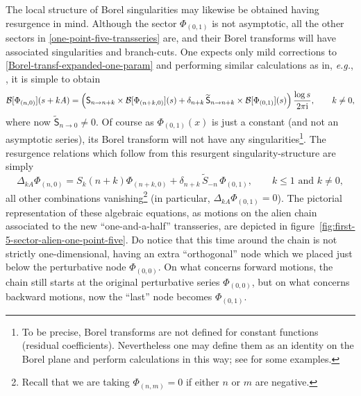 \documentclass[11pt,a4paper]{article}
\newcommand{\CB}{{\cal B}}
\newcommand{\be}{\begin{equation}}
\newcommand{\ee}{\end{equation}}
\newcommand{\rmi}{{\mathrm{i}}}
\begin{document}
The local structure of Borel singularities may likewise be obtained having resurgence in mind. Although the sector $\Phi_{(0,1)}$ is not asymptotic, all the other sectors in \eqref{one-point-five-transseries} are, and their Borel transforms will have associated singularities and branch-cuts. One expects only mild corrections to \eqref{Borel-transf-expanded-one-param} and performing similar calculations as in, \textit{e.g.}, \cite{asv11}, it is simple to obtain
%
\be
\label{Borel-transf-expanded-one-point-five}
\CB [\Phi_{(n,0)}] (s+kA) = \left( \mathsf{S}_{n\to n+k} \times \CB [\Phi_{(n+k,0)}] (s) + \delta_{n+k}\, \widetilde{\mathsf{S}}_{n\to n+k} \times \CB [\Phi_{(0,1)}] (s) \right) \frac{\log s}{2\pi\rmi}, \qquad k \neq 0,
\ee
%
\noindent
where now $\widetilde{\mathsf{S}}_{n\to0} \neq 0$. Of course as $\Phi_{(0,1)}(x)$ is just a constant (and not an asymptotic series), its Borel transform will not have any singularities\footnote{To be precise, Borel transforms are not defined for constant functions (residual coefficients). Nevertheless one may define them as an identity on the Borel plane and perform calculations in this way; see \cite{d14} for some examples.}. The resurgence relations which follow from this resurgent singularity-structure are simply
%
\be
\label{Delta-ka-one-point-five}
\Delta_{k A} \Phi_{(n,0)} = S_k \left(n+k\right) \Phi_{(n+k,0)} + \delta_{n+k}\, \widetilde{S}_{-n}\, \Phi_{(0,1)}, \qquad k \le 1 \text{  and  } k \neq 0,
\ee
%
\noindent
all other combinations vanishing\footnote{Recall that we are taking $\Phi_{(n,m)}=0$ if either $n$ or $m$ are negative.} (in particular, $\Delta_{kA} \Phi_{(0,1)} = 0$). The pictorial representation of these algebraic equations, as motions on the alien chain associated to the new ``one-and-a-half'' transseries, are depicted in figure~\ref{fig:first-5-sector-alien-one-point-five}. Do notice that this time around the chain is not strictly one-dimensional, having an extra ``orthogonal'' node which we placed just below the perturbative node $\Phi_{(0,0)}$. On what concerns forward motions, the chain still starts at the original perturbative series $\Phi_{(0,0)}$, but on what concerns backward motions, now the ``last'' node becomes $\Phi_{(0,1)}$.
\end{document}
